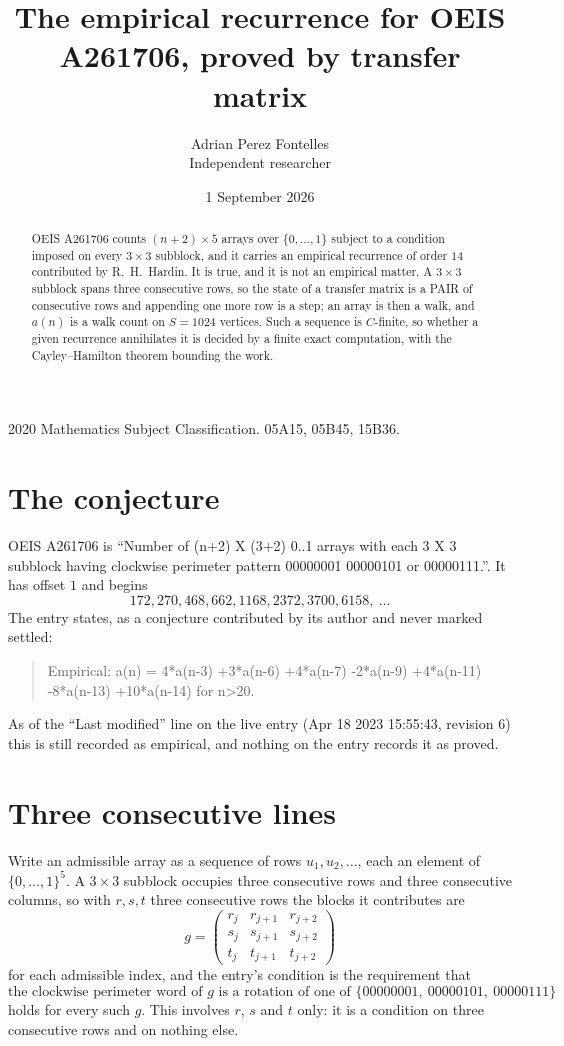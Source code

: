 \documentclass[11pt,a4paper]{article}
\title{The empirical recurrence for OEIS A261706, proved by transfer matrix}
\author{Adrian Perez Fontelles\\ \small Independent researcher}
\date{1 September 2026}
\theoremstyle{plain}
\theoremstyle{definition}
\begin{document}
\maketitle

\begin{abstract}
OEIS A261706 counts $(n+2)\times5$ arrays over $\{0,\dots,1\}$ subject to a condition imposed on
every $3\times3$ subblock, and it carries an empirical recurrence of order $14$
contributed by R.~H.~Hardin. It is true, and it is not an empirical matter. A $3\times3$
subblock spans three consecutive rows, so the state of a transfer matrix is a PAIR of
consecutive rows and appending one more row is a step; an array is then a walk, and
$a(n)$ is a walk count on $S=1024$ vertices. Such a sequence is $C$-finite, so whether a given
recurrence annihilates it is decided by a finite exact computation, with the Cayley--Hamilton
theorem bounding the work.
\end{abstract}

\noindent\small 2020 Mathematics Subject Classification. 05A15, 05B45, 15B36.\normalsize

\section{The conjecture}

OEIS A261706 is ``Number of (n+2) X (3+2) 0..1 arrays with each 3 X 3 subblock having clockwise perimeter pattern 00000001 00000101 or 00000111.''. It has offset $1$ and begins
\[
172, 270, 468, 662, 1168, 2372, 3700, 6158,\ \dots
\]
The entry states, as a conjecture contributed by its author and never marked settled:
\begin{quote}
Empirical: a(n) = 4*a(n-3) +3*a(n-6) +4*a(n-7) -2*a(n-9) +4*a(n-11) -8*a(n-13) +10*a(n-14) for n>20.
\end{quote}
As of the ``Last modified'' line on the live entry (Apr 18 2023 15:55:43, revision 6) this is still
recorded as empirical, and nothing on the entry records it as proved.

\section{Three consecutive lines}

Write an admissible array as a sequence of rows $u_1,u_2,\dots$, each an element of
$\{0,\dots,1\}^{5}$. A $3\times3$ subblock occupies three consecutive rows and
three consecutive columns, so with $r,s,t$ three consecutive rows the blocks it
contributes are
\[
g=\begin{pmatrix}r_j&r_{j+1}&r_{j+2}\\ s_j&s_{j+1}&s_{j+2}\\ t_j&t_{j+1}&t_{j+2}\end{pmatrix}
\]
for each admissible index, and the entry's condition is the requirement that
\[
\text{the clockwise perimeter word of }g\text{ is a rotation of one of }\{00000001,\ 00000101,\ 00000111\}
\]
holds for every such $g$. This involves $r$, $s$ and $t$ only: it is a condition on
three consecutive rows and on nothing else.
\end{document}
